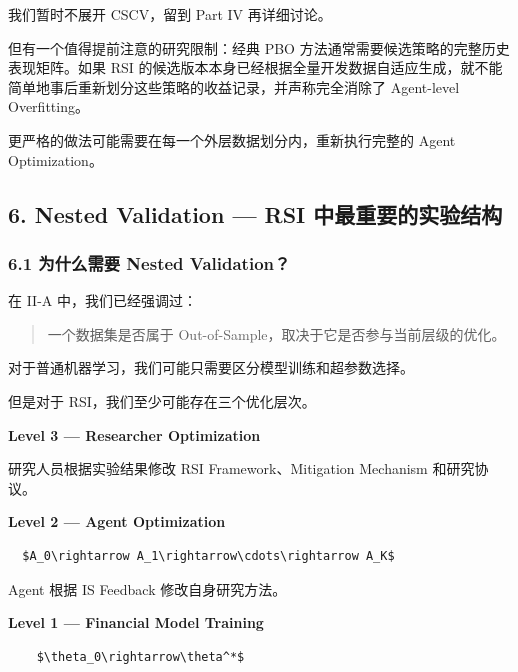 我们暂时不展开 CSCV，留到 Part IV 再详细讨论。

但有一个值得提前注意的研究限制：经典 PBO 方法通常需要候选策略的完整历史表现矩阵。如果 RSI 的候选版本本身已经根据全量开发数据自适应生成，就不能简单地事后重新划分这些策略的收益记录，并声称完全消除了 Agent-level Overfitting。

更严格的做法可能需要在每一个外层数据划分内，重新执行完整的 Agent Optimization。

\hypertarget{part-2-27-0001-nested-validation-rsi-ux4e2dux6700ux91cdux8981ux7684ux5b9eux9a8cux7ed3ux6784}{%
\subsection{6. Nested Validation --- RSI 中最重要的实验结构}\label{part-2-27-0001-nested-validation-rsi-ux4e2dux6700ux91cdux8981ux7684ux5b9eux9a8cux7ed3ux6784}}

\hypertarget{part-2-27-0001-ux4e3aux4ec0ux4e48ux9700ux8981-nested-validation}{%
\subsubsection{6.1 为什么需要 Nested Validation？}\label{part-2-27-0001-ux4e3aux4ec0ux4e48ux9700ux8981-nested-validation}}

在 II-A 中，我们已经强调过：

\begin{quote}
一个数据集是否属于 Out-of-Sample，取决于它是否参与当前层级的优化。
\end{quote}

对于普通机器学习，我们可能只需要区分模型训练和超参数选择。

但是对于 RSI，我们至少可能存在三个优化层次。

\textbf{Level 3 --- Researcher Optimization}

研究人员根据实验结果修改 RSI Framework、Mitigation Mechanism 和研究协议。

\textbf{Level 2 --- Agent Optimization}

\begin{verbatim}
  $A_0\rightarrow A_1\rightarrow\cdots\rightarrow A_K$
\end{verbatim}

Agent 根据 IS Feedback 修改自身研究方法。

\textbf{Level 1 --- Financial Model Training}

\begin{verbatim}
    $\theta_0\rightarrow\theta^*$
\end{verbatim}

